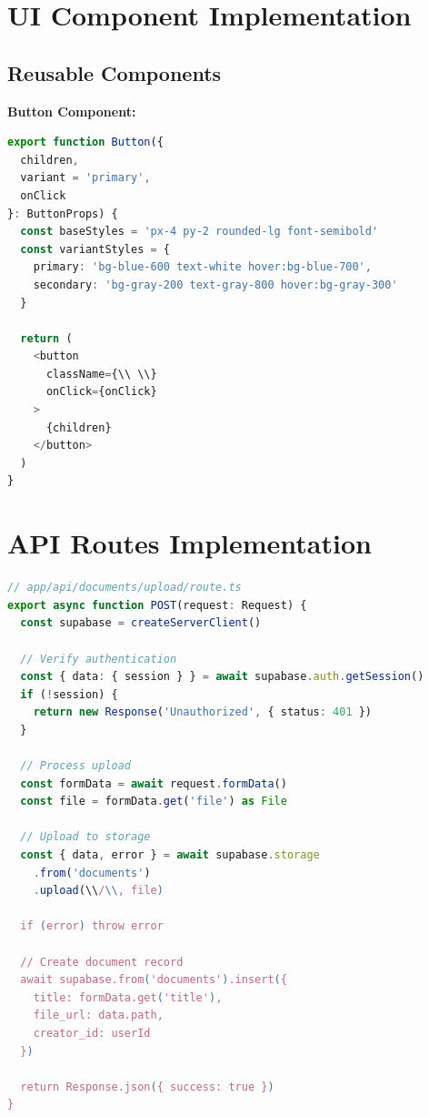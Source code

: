\section{UI Component Implementation}

\subsection{Reusable Components}

\textbf{Button Component:}
\begin{lstlisting}[language=TypeScript]
export function Button({ 
  children, 
  variant = 'primary',
  onClick 
}: ButtonProps) {
  const baseStyles = 'px-4 py-2 rounded-lg font-semibold'
  const variantStyles = {
    primary: 'bg-blue-600 text-white hover:bg-blue-700',
    secondary: 'bg-gray-200 text-gray-800 hover:bg-gray-300'
  }
  
  return (
    <button 
      className={\\ \\}
      onClick={onClick}
    >
      {children}
    </button>
  )
}
\end{lstlisting}

\section{API Routes Implementation}

\begin{lstlisting}[language=TypeScript]
// app/api/documents/upload/route.ts
export async function POST(request: Request) {
  const supabase = createServerClient()
  
  // Verify authentication
  const { data: { session } } = await supabase.auth.getSession()
  if (!session) {
    return new Response('Unauthorized', { status: 401 })
  }
  
  // Process upload
  const formData = await request.formData()
  const file = formData.get('file') as File
  
  // Upload to storage
  const { data, error } = await supabase.storage
    .from('documents')
    .upload(\\/\\, file)
    
  if (error) throw error
  
  // Create document record
  await supabase.from('documents').insert({
    title: formData.get('title'),
    file_url: data.path,
    creator_id: userId
  })
  
  return Response.json({ success: true })
}
\end{lstlisting}

